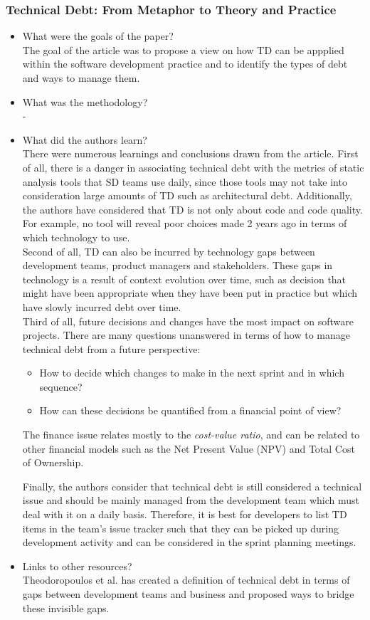 \documentclass{mprop}
\begin{document}
\subsubsection{Technical Debt: From Metaphor to Theory and Practice} \cite{Kruchten2012}
\begin{itemize}
\item What were the goals of the paper? \\
The goal of the article was to propose a view on how TD can be appplied within the software development practice and to identify the types of debt and ways to manage them.
\item What was the methodology? \\
-
\item What did the authors learn? \\
There were numerous learnings and conclusions drawn from the article.
First of all, there is a danger in associating technical debt with the metrics of static analysis tools that SD teams use daily, since those tools may not take into consideration large amounts of TD such as architectural debt. 
Additionally, the authors have considered that TD is not only about code and code quality. For example, no tool will reveal poor choices made 2 years ago in terms of which technology to use. \\

Second of all, TD can also be incurred by technology gaps between development teams, product managers and stakeholders.
These gaps in technology is a result of context evolution over time, such as decision that might have been appropriate when they have been put in practice but which have slowly incurred debt over time.\\

Third of all, future decisions and changes have the most impact on software projects. 
There are many questions unanswered in terms of how to manage technical debt from a future perspective:
\begin{itemize}
\item How to decide which changes to make in the next sprint and in which sequence?
\item How can these decisions be quantified from a financial point of view?
\end{itemize}
The finance issue relates mostly to the \textit{cost-value ratio}, and can be related to other financial models such as the Net Present Value (NPV) and Total Cost of Ownership.

Finally, the authors consider that technical debt is still considered a technical issue and should be mainly managed from the development team which must deal with it on a daily basis.
Therefore, it is best for developers to list TD items in the team's issue tracker such that they can be picked up during development activity and can be considered in the sprint planning meetings.   
\item Links to other resources? \\
Theodoropoulos et al. \cite{Theodoropoulos2011} has created a definition of technical debt in terms of gaps between development teams and business and proposed ways to bridge these invisible gaps. 
\end{itemize}
\end{document}
